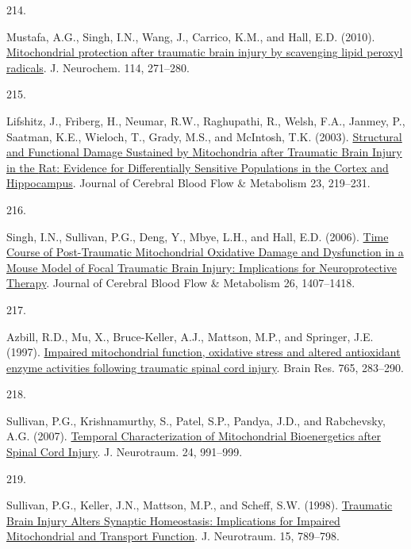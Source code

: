 \documentclass[
]{article}
\newlength{\cslhangindent}
\newlength{\csllabelwidth}
\newlength{\cslentryspacingunit} %
\newenvironment{CSLReferences}[2] %
 {%
  \setlength{\parindent}{0pt}
  \ifodd #1
  \let\oldpar\par
  \def\par{\hangindent=\cslhangindent\oldpar}
  \fi
  \setlength{\parskip}{#2\cslentryspacingunit}
 }%
 {}
\newcommand{\CSLLeftMargin}[1]{\parbox[t]{\csllabelwidth}{#1}}
\newcommand{\CSLRightInline}[1]{\parbox[t]{\linewidth - \csllabelwidth}{#1}\break}
\begin{document}
\begin{CSLReferences}{0}{0}
\leavevmode{}%
\CSLLeftMargin{214. }
\CSLRightInline{Mustafa, A.G., Singh, I.N., Wang, J., Carrico, K.M., and Hall, E.D. (2010). \href{https://doi.org/10.1111/j.1471-4159.2010.06749.x}{Mitochondrial protection after traumatic brain injury by scavenging lipid peroxyl radicals}. J. Neurochem. 114, 271--280.}

\leavevmode{}%
\CSLLeftMargin{215. }
\CSLRightInline{Lifshitz, J., Friberg, H., Neumar, R.W., Raghupathi, R., Welsh, F.A., Janmey, P., Saatman, K.E., Wieloch, T., Grady, M.S., and McIntosh, T.K. (2003). \href{https://doi.org/10.1097/01.WCB.0000040581.43808.03}{Structural and {Functional Damage Sustained} by {Mitochondria} after {Traumatic Brain Injury} in the {Rat}: {Evidence} for {Differentially Sensitive Populations} in the {Cortex} and {Hippocampus}}. Journal of Cerebral Blood Flow \& Metabolism 23, 219--231.}

\leavevmode{}%
\CSLLeftMargin{216. }
\CSLRightInline{Singh, I.N., Sullivan, P.G., Deng, Y., Mbye, L.H., and Hall, E.D. (2006). \href{https://doi.org/10.1038/sj.jcbfm.9600297}{Time {Course} of {Post-Traumatic Mitochondrial Oxidative Damage} and {Dysfunction} in a {Mouse Model} of {Focal Traumatic Brain Injury}: {Implications} for {Neuroprotective Therapy}}. Journal of Cerebral Blood Flow \& Metabolism 26, 1407--1418.}

\leavevmode{}%
\CSLLeftMargin{217. }
\CSLRightInline{Azbill, R.D., Mu, X., Bruce-Keller, A.J., Mattson, M.P., and Springer, J.E. (1997). \href{https://doi.org/10.1016/S0006-8993(97)00573-8}{Impaired mitochondrial function, oxidative stress and altered antioxidant enzyme activities following traumatic spinal cord injury}. Brain Res. 765, 283--290.}

\leavevmode{}%
\CSLLeftMargin{218. }
\CSLRightInline{Sullivan, P.G., Krishnamurthy, S., Patel, S.P., Pandya, J.D., and Rabchevsky, A.G. (2007). \href{https://doi.org/10.1089/neu.2006.0242}{Temporal {Characterization} of {Mitochondrial Bioenergetics} after {Spinal Cord Injury}}. J. Neurotraum. 24, 991--999.}

\leavevmode{}%
\CSLLeftMargin{219. }
\CSLRightInline{Sullivan, P.G., Keller, J.N., Mattson, M.P., and Scheff, S.W. (1998). \href{https://doi.org/10.1089/neu.1998.15.789}{Traumatic {Brain Injury Alters Synaptic Homeostasis}: {Implications} for {Impaired Mitochondrial} and {Transport Function}}. J. Neurotraum. 15, 789--798.}


\end{CSLReferences}
\end{document}
